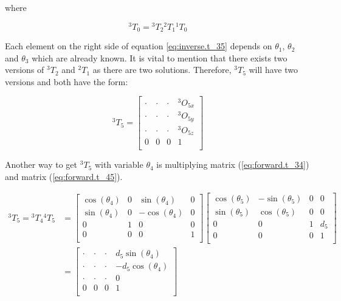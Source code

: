 \documentclass{article}
\renewcommand{\c}[1]{\cos(\theta_{#1})}
\newcommand{\s}[1]{\sin(\theta_{#1})}
\newcommand{\T}[2]{{}^{#1}T_{#2}}
\renewcommand{\O}[2]{{}^{#1}O_{#2}}
\begin{document}
where

\begin{equation}
\label{eq:inverse.t_30}
\T{3}{0} = \T{3}{2}\T{2}{1}\T{1}{0} 
\end{equation}

Each element on the right side of equation \ref{eq:inverse.t_35} depends on $\theta_1$, $\theta_2$ and $\theta_3$ which are already known. It is vital to mention that there exists two versions of $\T{3}{2}$ and $\T{2}{1}$ as there are two solutions. Therefore, $\T{3}{5}$ will have two versions and both have the form:

\begin{equation}
\label{eq:inverse.t_35_expanded}
\T{3}{5}= \left[
\begin{array}{cccc}
	\cdot & \cdot & \cdot & \O{3}{5x} \\
	\cdot & \cdot & \cdot & \O{3}{5y} \\
	\cdot & \cdot & \cdot & \O{3}{5z} \\
    0 & 0 & 0 & 1 \\
\end{array}
\right] 
\end{equation}

Another way to get $\T{3}{5}$ with variable $\theta_4$ is multiplying matrix (\ref{eq:forward.t_34}) and matrix (\ref{eq:forward.t_45}).

\begin{equation}
\begin{aligned}
\label{eq:inverse.t_35_forward}
\T{3}{5} = \T{3}{4} \T{4}{5} & =
\left[
\begin{array}{cccc}
	\c{4} & 0 & \s{4} & 0 \\
	\s{4} & 0 & -\c{4} & 0 \\
	0 & 1 & 0 & 0 \\
	0 & 0 & 0 & 1 \\
\end{array}
\right] \left[
\begin{array}{cccc}
	\c{5} & -\s{5} & 0 & 0 \\
	\s{5} & \c{5} & 0 & 0  \\
	0 & 0 & 1 & d_5\\
	0 & 0 & 0 & 1 \\
\end{array}
\right] \\
& = \left[
\begin{array}{cccc}
	\cdot & \cdot & \cdot & d_5\s{4} \\
	\cdot & \cdot & \cdot & -d_5\c{4}\\
	\cdot & \cdot & \cdot & 0\\
    0 & 0 & 0 & 1 \\
\end{array}
\right] 
\end{aligned}
\end{equation}
\end{document}
